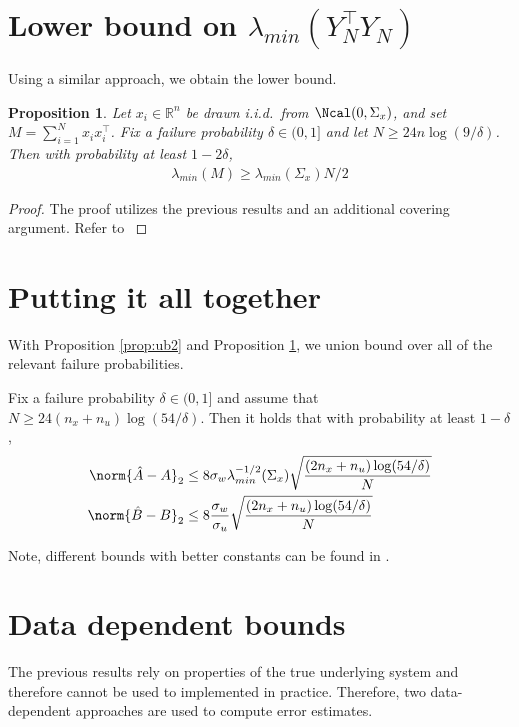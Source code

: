 \documentclass{article}[12pt]
\newtheorem{prop}{Proposition}
\def \R{\mathbb R}
\begin{document}
\section{Lower bound on $\lambda_{min}(Y_N^\top Y_N)$}
Using a similar approach, we obtain the lower bound.
\begin{prop}
	\label{prop:lb2}
	Let $x_i \in \R^n$ be drawn i.i.d.\ from $\Ncal(0, \Sigma_x)$, and set $M = \sum_{i=1}^{N} x_i x_i^\top$. Fix a failure probability $\delta\in (0, 1]$ and let $N \geq 24n \log(9/\delta)$. Then with probability at least $1-2\delta$, 
	\begin{align*}
	\lambda_{min}(M) \geq \lambda_{min}(\Sigma_x)N/2
	\end{align*}
\end{prop}

\begin{proof}
	The proof utilizes the previous results and an additional covering argument. 
	Refer to \cite{matni_tutorial_2019}
\end{proof}
\section{Putting it all together}
With Proposition \ref{prop:ub2} and Proposition \ref{prop:lb2}, we union bound over all of the relevant failure probabilities. 

\begin{theorem}
	Fix a failure probability $\delta \in (0, 1]$ and assume that $N \geq 24(n_x + n_u) \log(54/\delta)$. 
	Then it holds that with probability at least $1-\delta$, 
	\begin{align*}
	\norm{\hat{A}-A}_2 &\leq 8\sigma_w \lambda_{min}^{-1/2}(\Sigma_x) \sqrt{\frac{(2n_x+n_u)\log(54/\delta)}{N}} \\
	\norm{\hat{B}-B}_2 &\leq 8\frac{\sigma_w}{\sigma_u}  \sqrt{\frac{(2n_x+n_u)\log(54/\delta)}{N}}
	\end{align*} 
\end{theorem}

Note, different bounds with better constants can be found in \cite{dean_sample_2017}.

\section{Data dependent bounds}
The previous results rely on properties of the true underlying system and therefore cannot be used to implemented in practice. 
Therefore, two data-dependent approaches are used to compute error estimates.
\end{document}
